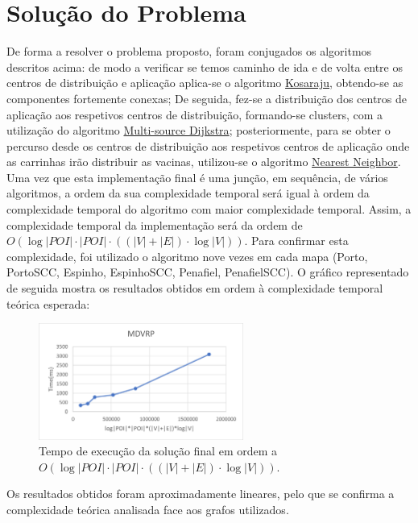 \documentclass[12pt,a4paper]{report}
\begin{document}
\section{Solução do Problema}
De forma a resolver o problema proposto, foram conjugados os algoritmos descritos acima: de modo a verificar se temos caminho de ida e de volta entre
os centros de distribuição e aplicação aplica-se o algoritmo \hyperref[algo:kosaraju]{Kosaraju}, obtendo-se as componentes fortemente conexas; De seguida, fez-se 
a distribuição dos centros de aplicação aos respetivos centros de distribuição, formando-se clusters, com a utilização do algoritmo \hyperref[algo:msdijkstra]{Multi-source Dijkstra};
posteriormente, para se obter o percurso desde os centros de distribuição aos respetivos centros de aplicação onde as carrinhas irão distribuir as vacinas,
utilizou-se o algoritmo \hyperref[algo:nn]{Nearest Neighbor}.
Uma vez que esta implementação final é uma junção, em sequência, de vários algoritmos, a ordem da sua complexidade temporal será igual à ordem da complexidade temporal
do algoritmo com maior complexidade temporal. Assim, a complexidade temporal da implementação será da ordem de \( O(\log|POI| \cdot |POI| \cdot ((|V| + |E|)\cdot \log|V|)) \).
Para confirmar esta complexidade, foi utilizado o algoritmo nove vezes em cada mapa (Porto, PortoSCC, Espinho, EspinhoSCC, Penafiel, PenafielSCC).
O gráfico representado de seguida mostra os resultados obtidos em ordem à complexidade temporal teórica esperada:

\begin{figure}[H]
	\includegraphics[width=0.6\textwidth]{./imgs/charts/MDVRPTimeComplexity.png}
	\centering
	\caption{Tempo de execução da solução final em ordem a $O(\log|POI| \cdot |POI| \cdot ((|V| + |E|)\cdot \log|V|))$.}
\end{figure}

Os resultados obtidos foram aproximadamente lineares, pelo que se confirma a complexidade teórica analisada
face aos grafos utilizados.
\end{document}
